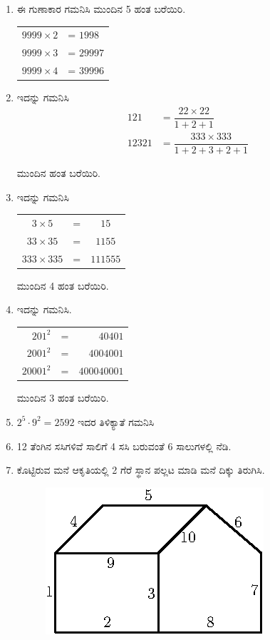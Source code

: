 \begin{enumerate}
\item ಈ ಗುಣಾಕಾರ ಗಮನಿಸಿ ಮುಂದಿನ 5 ಹಂತ ಬರೆಯಿರಿ. 

\begin{tabular}{ll}
$9999\times 2$ & = $1998$\\
$9999\times 3$ & = $29997$\\
$9999\times 4$ & = $39996$
\end{tabular} 

\item ಇದನ್ನು ಗಮನಿಸಿ 
\begin{align*}
121 & = \dfrac{22\times 22}{1 + 2 + 1}\\
12321 & = \dfrac{333 \times 333}{1 + 2 + 3 + 2 + 1}
\end{align*}  

ಮುಂದಿನ ಹಂತ ಬರೆಯಿರಿ. 

\item ಇದನ್ನು ಗಮನಿಸಿ 

\begin{tabular}{ccc}
$3\times 5$ & = & $15$\\
$33\times 35$ & = & $1155$\\
$333 \times 335$ & = & $111555$
\end{tabular}

ಮುಂದಿನ 4 ಹಂತ ಬರೆಯಿರಿ. 

\item ಇದನ್ನು ಗಮನಿಸಿ.

\begin{tabular}[[t]{rcr}
$201^{2}$ & = & $40401$\\
$2001^{2}$ & = & $4004001$\\
$20001^{2}$ & = & $400040001$
\end{tabular}

ಮುಂದಿನ 3 ಹಂತ ಬರೆಯಿರಿ. 

\item $2^{5} \cdot 9^{2} = 2592$ ಇದರ ತಿಳಿಕ್ಯಾತೆ ಗಮನಿಸಿ 

\item 12 ತೆಂಗಿನ ಸಸಿಗಳಿವೆ ಸಾಲಿಗೆ 4 ಸಸಿ ಬರುವಂತೆ 6 ಸಾಲುಗಳಲ್ಲಿ ನೆಡಿ. 

\item ಕೊಟ್ಟಿರುವ ಮನೆ ಆಕೃತಿಯಲ್ಲಿ 2 ಗೆರೆ ಸ್ಥಾನ ಪಲ್ಲಟ ಮಾಡಿ ಮನೆ ದಿಕ್ಕು ತಿರುಗಿಸಿ. 
\begin{figure}[!h]
\centering
\includegraphics{images/chap5/q19.eps}
\end{figure}


\end{enumerate}
